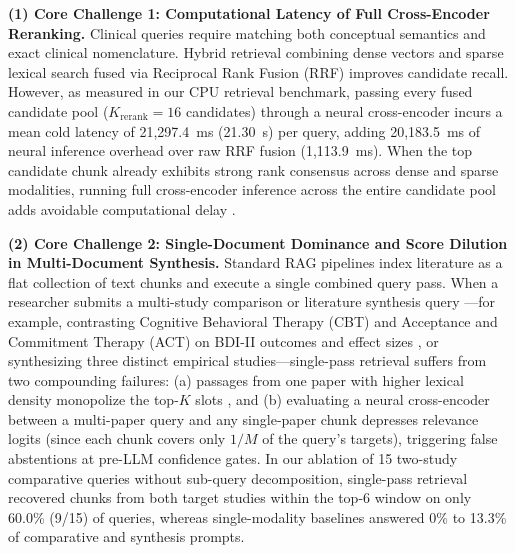 \documentclass[10pt]{SPIIRAS_Proceedings}
\begin{document}
\textbf{(1) Core Challenge 1: Computational Latency of Full Cross-Encoder Reranking.} Clinical queries require matching both conceptual semantics and exact clinical nomenclature. Hybrid retrieval combining dense vectors \cite{wang2022text} and sparse lexical search \cite{robertson2009probabilistic} fused via Reciprocal Rank Fusion (RRF) \cite{cormack2009reciprocal} improves candidate recall. However, as measured in our CPU retrieval benchmark, passing every fused candidate pool ($K_{\mathrm{rerank}} = 16$ candidates) through a neural cross-encoder \cite{chen2024bge,xiao2023cpack,baai2024bgererankerv2m3} incurs a mean cold latency of 21,297.4~ms (21.30~s) per query, adding 20,183.5~ms of neural inference overhead over raw RRF fusion (1,113.9~ms). When the top candidate chunk already exhibits strong rank consensus across dense and sparse modalities, running full cross-encoder inference across the entire candidate pool adds avoidable computational delay \cite{gao2024modular}.

\textbf{(2) Core Challenge 2: Single-Document Dominance and Score Dilution in Multi-Document Synthesis.} Standard RAG pipelines \cite{izacard2021leveraging,liu2023llamaindex} index literature as a flat collection of text chunks and execute a single combined query pass. When a researcher submits a multi-study comparison or literature synthesis query \cite{moher2009preferred}---for example, contrasting Cognitive Behavioral Therapy (CBT) and Acceptance and Commitment Therapy (ACT) on BDI-II \cite{beck1996manual} outcomes and effect sizes \cite{cohen1988statistical}, or synthesizing three distinct empirical studies---single-pass retrieval suffers from two compounding failures: (a) passages from one paper with higher lexical density monopolize the top-$K$ slots \cite{izacard2021leveraging,gao2024modular}, and (b) evaluating a neural cross-encoder between a multi-paper query and any single-paper chunk depresses relevance logits (since each chunk covers only $1/M$ of the query's targets), triggering false abstentions at pre-LLM confidence gates. In our ablation of 15 two-study comparative queries without sub-query decomposition, single-pass retrieval recovered chunks from both target studies within the top-6 window on only 60.0\% (9/15) of queries, whereas single-modality baselines answered 0\% to 13.3\% of comparative and synthesis prompts.
\end{document}
